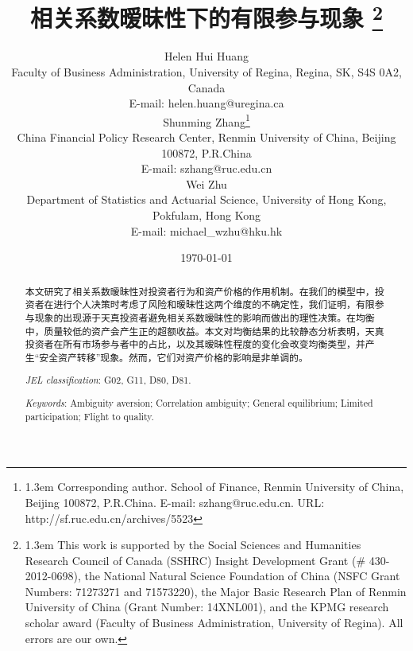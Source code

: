 \documentclass[10.0pt]{article}
\begin{document}
\countdef{}
\overfullrule=0pt



\title{相关系数暧昧性下的有限参与现象
	\footnote{\baselineskip1.3em This work is supported by the Social Sciences and Humanities Research Council of Canada (SSHRC) Insight Development Grant ($\#$ 430-2012-0698), the National Natural Science Foundation of China (NSFC Grant Numbers: 71273271 and 71573220), the Major Basic Research Plan of Renmin University of China (Grant Number: 14XNL001), and the KPMG research scholar award (Faculty of Business Administration, University of Regina). All errors are our own.}}
\author{{\small Helen Hui Huang} \\ {\small Faculty of Business Administration, University of Regina, Regina, SK, S4S 0A2, Canada} \\ {\small E-mail: helen.huang@uregina.ca} \\ {\small Shunming Zhang}\footnote{\baselineskip1.3em Corresponding author. School of Finance, Renmin University of China, Beijing 100872, P.R.China. E-mail: szhang@ruc.edu.cn. URL: http://sf.ruc.edu.cn/archives/5523} \\ {\small China Financial Policy Research Center, Renmin University of China, Beijing 100872, P.R.China} \\ {\small E-mail: szhang@ruc.edu.cn} \\ {\small Wei Zhu} \\ {\small Department of Statistics and Actuarial Science, University of Hong Kong, Pokfulam, Hong Kong} \\ {\small E-mail: michael\_wzhu@hku.hk}}
\date{\today}
\maketitle

\begin{abstract}
本文研究了相关系数暧昧性对投资者行为和资产价格的作用机制。在我们的模型中，投资者在进行个人决策时考虑了风险和暧昧性这两个维度的不确定性，我们证明，有限参与现象的出现源于天真投资者避免相关系数暧昧性的影响而做出的理性决策。在均衡中，质量较低的资产会产生正的超额收益。本文对均衡结果的比较静态分析表明，天真投资者在所有市场参与者中的占比，以及其暧昧性程度的变化会改变均衡类型，并产生``安全资产转移''现象。然而，它们对资产价格的影响是非单调的。
	
	{\it JEL classification}: G02, G11, D80, D81.
	
	{\it Keywords}: Ambiguity aversion; Correlation ambiguity; General equilibrium; Limited participation; Flight to quality.
\end{abstract}
\end{document}
